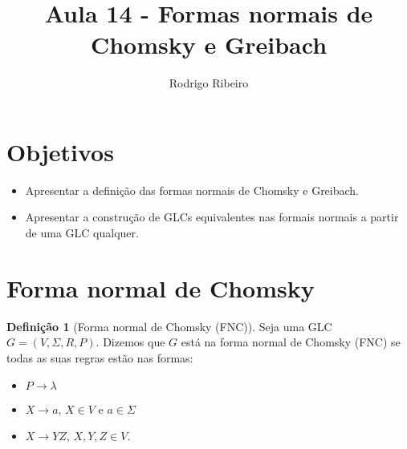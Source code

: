 \documentclass[a4paper]{article}
\theoremstyle{definition}
\newtheorem{Definition}{Definição}
\begin{document}
  \title{Aula 14 - Formas normais de Chomsky e Greibach}
  \author{Rodrigo Ribeiro}

  \maketitle


  \pagestyle{fancy}


  \section*{Objetivos}

  \begin{itemize}
     \item Apresentar a definição das formas normais de Chomsky e Greibach.
     \item Apresentar a construção de GLCs equivalentes nas formais normais
       a partir de uma GLC qualquer.     
  \end{itemize}


  \section{Forma normal de Chomsky}

  \begin{Definition}[Forma normal de Chomsky (FNC)]\label{FNC}
    Seja uma GLC $G=(V,\Sigma,R,P)$. Dizemos que $G$ está na forma normal de
    Chomsky (FNC) se todas as suas regras estão nas formas:
    \begin{itemize}
      \item $P \to \lambda$
      \item $X \to a$, $X \in V$ e $a \in\Sigma$
      \item $X \to YZ$, $X,Y,Z \in V$.
    \end{itemize}
  \end{Definition}
\end{document}
